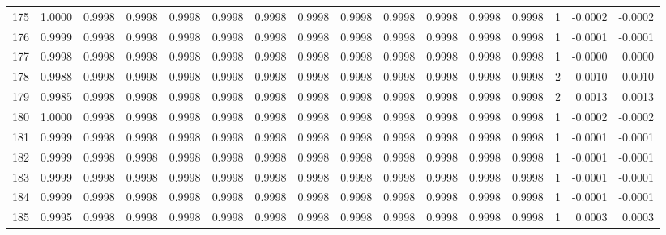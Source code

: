 \begin{tabular}{lrrrrrrrrrrrrrrr}
175 &      1.0000 &  0.9998 &  0.9998 &  0.9998 &  0.9998 &  0.9998 &  0.9998 &  0.9998 &  0.9998 &  0.9998 &   0.9998 &     0.9998 &      1 &                   -0.0002 &                    -0.0002 \\
176 &      0.9999 &  0.9998 &  0.9998 &  0.9998 &  0.9998 &  0.9998 &  0.9998 &  0.9998 &  0.9998 &  0.9998 &   0.9998 &     0.9998 &      1 &                   -0.0001 &                    -0.0001 \\
177 &      0.9998 &  0.9998 &  0.9998 &  0.9998 &  0.9998 &  0.9998 &  0.9998 &  0.9998 &  0.9998 &  0.9998 &   0.9998 &     0.9998 &      1 &                   -0.0000 &                     0.0000 \\
178 &      0.9988 &  0.9998 &  0.9998 &  0.9998 &  0.9998 &  0.9998 &  0.9998 &  0.9998 &  0.9998 &  0.9998 &   0.9998 &     0.9998 &      2 &                    0.0010 &                     0.0010 \\
179 &      0.9985 &  0.9998 &  0.9998 &  0.9998 &  0.9998 &  0.9998 &  0.9998 &  0.9998 &  0.9998 &  0.9998 &   0.9998 &     0.9998 &      2 &                    0.0013 &                     0.0013 \\
180 &      1.0000 &  0.9998 &  0.9998 &  0.9998 &  0.9998 &  0.9998 &  0.9998 &  0.9998 &  0.9998 &  0.9998 &   0.9998 &     0.9998 &      1 &                   -0.0002 &                    -0.0002 \\
181 &      0.9999 &  0.9998 &  0.9998 &  0.9998 &  0.9998 &  0.9998 &  0.9998 &  0.9998 &  0.9998 &  0.9998 &   0.9998 &     0.9998 &      1 &                   -0.0001 &                    -0.0001 \\
182 &      0.9999 &  0.9998 &  0.9998 &  0.9998 &  0.9998 &  0.9998 &  0.9998 &  0.9998 &  0.9998 &  0.9998 &   0.9998 &     0.9998 &      1 &                   -0.0001 &                    -0.0001 \\
183 &      0.9999 &  0.9998 &  0.9998 &  0.9998 &  0.9998 &  0.9998 &  0.9998 &  0.9998 &  0.9998 &  0.9998 &   0.9998 &     0.9998 &      1 &                   -0.0001 &                    -0.0001 \\
184 &      0.9999 &  0.9998 &  0.9998 &  0.9998 &  0.9998 &  0.9998 &  0.9998 &  0.9998 &  0.9998 &  0.9998 &   0.9998 &     0.9998 &      1 &                   -0.0001 &                    -0.0001 \\
185 &      0.9995 &  0.9998 &  0.9998 &  0.9998 &  0.9998 &  0.9998 &  0.9998 &  0.9998 &  0.9998 &  0.9998 &   0.9998 &     0.9998 &      1 &                    0.0003 &                     0.0003 \\

\end{tabular}
